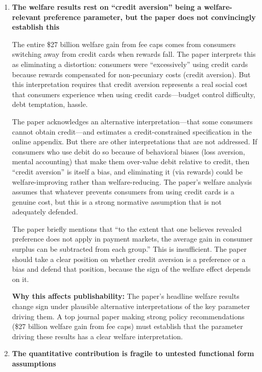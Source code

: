 \documentclass[11pt]{article}
\begin{document}
\begin{enumerate}[leftmargin=*]
    \item \textbf{The welfare results rest on ``credit aversion'' being a welfare-relevant preference parameter, but the paper does not convincingly establish this}

    The entire \$27 billion welfare gain from fee caps comes from consumers switching away from credit cards when rewards fall. The paper interprets this as eliminating a distortion: consumers were ``excessively'' using credit cards because rewards compensated for non-pecuniary costs (credit aversion). But this interpretation requires that credit aversion represents a real social cost that consumers experience when using credit cards---budget control difficulty, debt temptation, hassle.

    The paper acknowledges an alternative interpretation---that some consumers cannot obtain credit---and estimates a credit-constrained specification in the online appendix. But there are other interpretations that are not addressed. If consumers who use debit do so because of behavioral biases (loss aversion, mental accounting) that make them over-value debit relative to credit, then ``credit aversion'' is itself a bias, and eliminating it (via rewards) could be welfare-improving rather than welfare-reducing. The paper's welfare analysis assumes that whatever prevents consumers from using credit cards is a genuine cost, but this is a strong normative assumption that is not adequately defended.

    The paper briefly mentions that ``to the extent that one believes revealed preference does not apply in payment markets, the average gain in consumer surplus can be subtracted from each group.'' This is insufficient. The paper should take a clear position on whether credit aversion is a preference or a bias and defend that position, because the sign of the welfare effect depends on it.

    \textbf{Why this affects publishability:} The paper's headline welfare results change sign under plausible alternative interpretations of the key parameter driving them. A top journal paper making strong policy recommendations (\$27 billion welfare gain from fee caps) must establish that the parameter driving these results has a clear welfare interpretation.

    \item \textbf{The quantitative contribution is fragile to untested functional form assumptions}


\end{enumerate}
\end{document}
